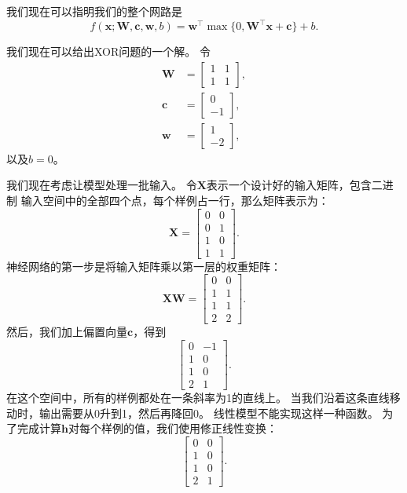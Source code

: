 我们现在可以指明我们的整个网路是
\begin{equation}
f(\bm{x}; \bm{W}, \bm{c}, \bm{w}, b) = \bm{w}^\top \max\{ 0, \bm{W}^\top \bm{x} + \bm{c} \} +b.
\end{equation}



我们现在可以给出XOR问题的一个解。
令
\begin{align}
\bm{W} &= \begin{bmatrix}
1 & 1\\
1 & 1
\end{bmatrix},\\
\bm{c} &= \begin{bmatrix}
0\\
-1
\end{bmatrix},\\
\bm{w} &= \begin{bmatrix}
1\\
-2
\end{bmatrix},
\end{align}
以及$b=0$。

我们现在考虑让模型处理一批输入。
令$\bm{X}$表示一个设计好的输入矩阵，包含二进制 输入空间中的全部四个点，每个样例占一行，那么矩阵表示为：
\begin{equation} 
\bm{X} = \begin{bmatrix}
0 & 0\\
0 & 1\\ 
1 & 0\\ 
1 & 1
\end{bmatrix}. 
\end{equation} 
神经网络的第一步是将输入矩阵乘以第一层的权重矩阵： \begin{equation}
\bm{X}\bm{W} = \begin{bmatrix} 
0 & 0\\ 
1 & 1\\ 
1 & 1\\ 
2 & 2 
\end{bmatrix}.
\end{equation} 
然后，我们加上偏置向量$\bm{c}$，得到 
\begin{equation} 
\begin{bmatrix} 
0 & -1\\
1 & 0\\ 
1 & 0\\ 
2 & 1 
\end{bmatrix}. 
\end{equation}
在这个空间中，所有的样例都处在一条斜率为1的直线上。
当我们沿着这条直线移动时，输出需要从0升到1，然后再降回0。
线性模型不能实现这样一种函数。
为了完成计算$\bm{h}$对每个样例的值，我们使用修正线性变换： 
\begin{equation}
\begin{bmatrix} 
0 & 0\\ 
1 & 0\\ 
1 & 0\\ 
2 & 1 
\end{bmatrix}. 
\end{equation}

